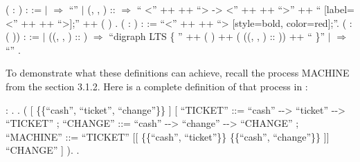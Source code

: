 \begin{coqdoccode}
	\coqdocnoindent
	  ( :  ) :  :=\coqdoceol
	\coqdocindent{1.00em}
	  \coqdoceol
	\coqdocindent{1.00em}
	\ensuremath{|}  \ensuremath{\Rightarrow} ``''\coqdoceol
	\coqdocindent{1.00em}
	\ensuremath{|} (, , ) ::  \ensuremath{\Rightarrow} `` <'' ++  ++ ``> -> <'' ++  ++ ``>'' ++ `` [label=<'' ++  ++ ``>];'' ++ ( )\coqdoceol
	\coqdocindent{1.00em}
	.\coqdoceol
	\coqdocemptyline
	\coqdocnoindent
	  ( : ) :  := ``<'' ++  ++ ``> [style=bold, color=red];''.\coqdoceol
	\coqdocemptyline
	\coqdocnoindent
	  ( :  ( )) :  :=\coqdoceol
	\coqdocindent{1.00em}
	  \coqdoceol
	\coqdocindent{1.00em}
	\ensuremath{|}  ((, , ) :: ) \ensuremath{\Rightarrow}\coqdoceol
	\coqdocindent{2.00em}
	``digraph LTS \{ '' ++ ( ) ++ ( ((, , ) :: )) ++ `` \}''\coqdoceol
	\coqdocindent{1.00em}
	\ensuremath{|} \coqdocvar{\_} \ensuremath{\Rightarrow} ``''\coqdoceol
	\coqdocindent{1.00em}
	.\coqdoceol
\end{coqdoccode}

To demonstrate what these definitions can achieve, recall the process MACHINE from the section 3.1.2. Here is a complete definition of that process in \CSPcoq{}:

\begin{coqdoccode}
	\coqdocnoindent
	  : .\coqdoceol
	\coqdocnoindent
	.\coqdoceol
	\coqdocindent{1.00em}
	 (\coqdoceol
	\coqdocindent{2.00em}
	\coqdoceol
	\coqdocindent{2.00em}
	[  \{\{``cash'', ``ticket'', ``change''\}\} ]\coqdoceol
	\coqdocindent{2.00em}
	[ ``TICKET'' ::= ``cash'' -{}-> ``ticket'' -{}->  ``TICKET''\coqdoceol
	\coqdocindent{2.00em}
	; ``CHANGE'' ::= ``cash'' -{}-> ``change'' -{}->  ``CHANGE''\coqdoceol
	\coqdocindent{2.00em}
	; ``MACHINE'' ::=  ``TICKET'' [[ \{\{``cash'', ``ticket''\}\}  \{\{``cash'', ``change''\}\} ]]  ``CHANGE'' ]\coqdoceol
	\coqdocindent{1.00em}
	).\coqdoceol
	\coqdocnoindent
	.\coqdoceol
\end{coqdoccode}

